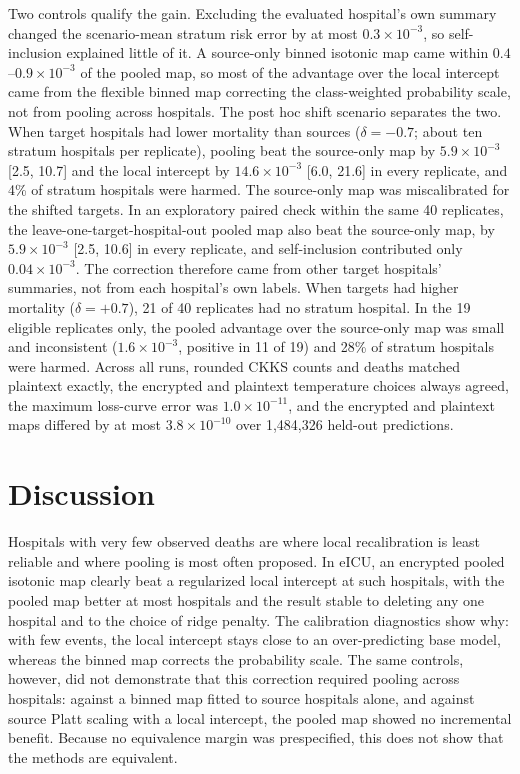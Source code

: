 \documentclass[11pt]{article}
\begin{document}
Two controls qualify the gain. Excluding the evaluated hospital's own summary changed the scenario-mean stratum risk error by at most $0.3\times10^{-3}$, so self-inclusion explained little of it. A source-only binned isotonic map came within $0.4$--$0.9\times10^{-3}$ of the pooled map, so most of the advantage over the local intercept came from the flexible binned map correcting the class-weighted probability scale, not from pooling across hospitals. The post hoc shift scenario separates the two. When target hospitals had lower mortality than sources ($\delta=-0.7$; about ten stratum hospitals per replicate), pooling beat the source-only map by $5.9\times10^{-3}$ [2.5, 10.7] and the local intercept by $14.6\times10^{-3}$ [6.0, 21.6] in every replicate, and 4\% of stratum hospitals were harmed. The source-only map was miscalibrated for the shifted targets. In an exploratory paired check within the same 40 replicates, the leave-one-target-hospital-out pooled map also beat the source-only map, by $5.9\times10^{-3}$ [2.5, 10.6] in every replicate, and self-inclusion contributed only $0.04\times10^{-3}$. The correction therefore came from other target hospitals' summaries, not from each hospital's own labels. When targets had higher mortality ($\delta=+0.7$), 21 of 40 replicates had no stratum hospital. In the 19 eligible replicates only, the pooled advantage over the source-only map was small and inconsistent ($1.6\times10^{-3}$, positive in 11 of 19) and 28\% of stratum hospitals were harmed. Across all runs, rounded CKKS counts and deaths matched plaintext exactly, the encrypted and plaintext temperature choices always agreed, the maximum loss-curve error was $1.0\times10^{-11}$, and the encrypted and plaintext maps differed by at most $3.8\times10^{-10}$ over 1,484,326 held-out predictions.



\section*{Discussion}
Hospitals with very few observed deaths are where local recalibration is least reliable and where pooling is most often proposed. In eICU, an encrypted pooled isotonic map clearly beat a regularized local intercept at such hospitals, with the pooled map better at most hospitals and the result stable to deleting any one hospital and to the choice of ridge penalty. The calibration diagnostics show why: with few events, the local intercept stays close to an over-predicting base model, whereas the binned map corrects the probability scale. The same controls, however, did not demonstrate that this correction required pooling across hospitals: against a binned map fitted to source hospitals alone, and against source Platt scaling with a local intercept, the pooled map showed no incremental benefit. Because no equivalence margin was prespecified, this does not show that the methods are equivalent.
\end{document}
